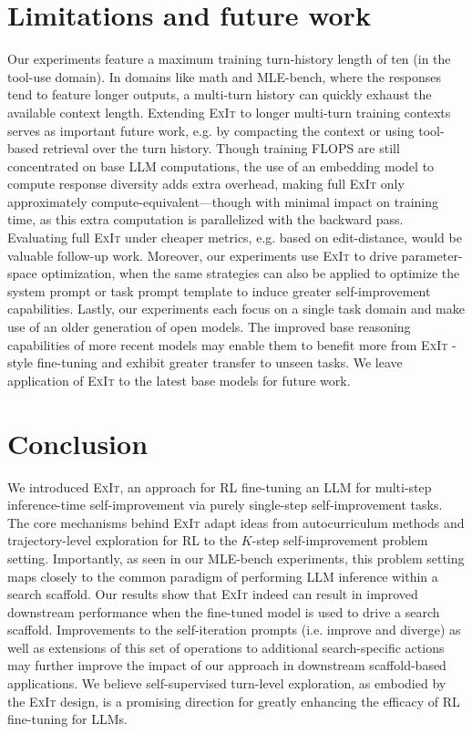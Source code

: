 \documentclass[10pt]{article} %
\newcommand{\methodname}{\textsc{ExIt}}
\begin{document}
\section{Limitations and future work}
Our experiments feature a maximum training turn-history length of ten (in the tool-use domain). In domains like math and MLE-bench, where the responses tend to feature longer outputs, a multi-turn history can quickly exhaust the available context length. Extending \methodname{} to longer multi-turn training contexts serves as important future work, e.g. by compacting the context or using tool-based retrieval over the turn history. Though training FLOPS are still concentrated on base LLM computations, the use of an embedding model to compute response diversity adds extra overhead, making full \methodname{} only approximately compute-equivalent—though with minimal impact on training time, as this extra computation is parallelized with the backward pass. Evaluating full \methodname{}  under cheaper metrics, e.g. based on edit-distance, would be valuable follow-up work. Moreover, our experiments use \methodname{}  to drive parameter-space optimization, when the same strategies can also be applied to optimize the system prompt or task prompt template to induce greater self-improvement capabilities. Lastly, our experiments each focus on a single task domain and make use of an older generation of open models. The improved base reasoning capabilities of more recent models may enable them to benefit more from \methodname{} -style fine-tuning and exhibit greater transfer to unseen tasks. We leave application of \methodname{} to the latest base models for future work.

\section{Conclusion}
We introduced \methodname{}, an approach for RL fine-tuning an LLM for multi-step inference-time self-improvement via purely single-step self-improvement tasks. The core mechanisms behind \methodname{} adapt ideas from autocurriculum methods and trajectory-level exploration for RL to the $K$-step self-improvement problem setting. Importantly, as seen in our MLE-bench experiments, this problem setting maps closely to the common  paradigm of performing LLM inference within a search scaffold. Our results show that \methodname{} indeed can result in improved downstream performance when the fine-tuned model is used to drive a search scaffold. Improvements to the self-iteration prompts (i.e. improve and diverge) as well as extensions of this set of operations to additional search-specific actions may further improve the impact of our approach in downstream scaffold-based applications. We believe self-supervised turn-level exploration, as embodied by the \methodname{} design, is a promising direction for greatly enhancing the efficacy of RL fine-tuning for LLMs.
\end{document}

